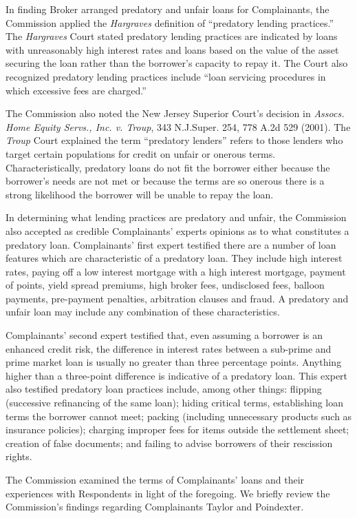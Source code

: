 In finding Broker arranged predatory and unfair loans for Complainants, the
Commission applied the \textit{Hargraves} definition of ``predatory lending
practices.'' The \textit{Hargraves} Court stated predatory lending practices
are indicated by loans with unreasonably high interest rates and loans based on
the value of the asset securing the loan rather than the borrower's capacity to
repay it. The Court also recognized predatory lending practices include ``loan
servicing procedures in which excessive fees are charged.''

The Commission also noted the New Jersey Superior Court's decision in
\textit{Assocs. Home Equity Servs., Inc. v. Troup},
343 N.J.Super. 254, 778 A.2d 529 (2001). The \textit{Troup} Court explained
the term ``predatory lenders'' refers to those lenders who target certain
populations for credit on unfair or onerous terms. Characteristically,
predatory loans do not fit the borrower either because the borrower's needs are
not met or because the terms are so onerous there is a strong likelihood the
borrower will be unable to repay the loan. 

In determining what lending practices are predatory and unfair, the Commission
also accepted as credible Complainants' experts opinions as to what constitutes
a predatory loan. Complainants' first expert testified there are a number of
loan features which are characteristic of a predatory loan. They include high
interest rates, paying off a low interest mortgage with a high interest
mortgage, payment of points, yield spread premiums, high broker fees,
undisclosed fees, balloon payments, pre-payment penalties, arbitration clauses
and fraud. A predatory and unfair loan may include any combination of these
characteristics. 

Complainants' second expert testified that, even assuming a borrower is an
enhanced credit risk, the difference in interest rates between a sub-prime and
prime market loan is usually no greater than three percentage points. Anything
higher than a three-point difference is indicative of a predatory loan. This
expert also testified predatory loan practices include, among other things:
flipping (successive refinancing of the same loan); hiding critical terms,
establishing loan terms the borrower cannot meet; packing (including
unnecessary products such as insurance policies); charging improper fees for
items outside the settlement sheet; creation of false documents; and failing to
advise borrowers of their rescission rights. 

The Commission examined the terms of Complainants' loans and their experiences
with Respondents in light of the foregoing. We briefly review the Commission's
findings regarding Complainants Taylor and Poindexter.

